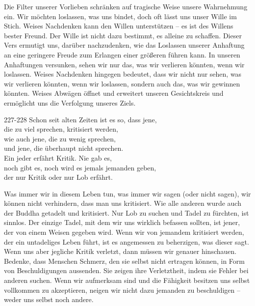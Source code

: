 \begin{dhpRefl}

Die Filter unserer Vorlieben schränken auf tragische Weise unsere Wahrnehmung
ein. Wir möchten loslassen, was uns bindet, doch oft lässt uns unser Wille im
Stich. Weises Nachdenken kann den Willen unterstützen – es ist des Willens
bester Freund. Der Wille ist nicht dazu bestimmt, es alleine zu schaffen.
Dieser Vers ermutigt uns, darüber nachzudenken, wie das Loslassen unserer
Anhaftung an eine geringere Freude zum Erlangen einer größeren führen kann. In
unseren Anhaftungen versunken, sehen wir nur das, was wir verlieren könnten,
wenn wir loslassen. Weises Nachdenken hingegen bedeutet, dass wir nicht nur
sehen, was wir verlieren könnten, wenn wir loslassen, sondern auch das, was
wir gewinnen könnten. Weises Abwägen öffnet und erweitert unseren
Gesichtskreis und ermöglicht uns die Verfolgung unseres Ziels.

\end{dhpRefl}


\begin{dhpVerse}{227-228}
\label{dhp-227}\label{dhp-228}
Schon seit alten Zeiten ist es so, dass jene,\\ 
die zu viel sprechen, kritisiert werden,\\ 
wie auch jene, die zu wenig sprechen,\\ 
und jene, die überhaupt nicht sprechen.\\ 
Ein jeder erfährt Kritik. Nie gab es,\\ 
noch gibt es, noch wird es jemals jemanden geben, \\ 
der nur Kritik oder nur Lob erfährt. 
\end{dhpVerse}

\begin{dhpRefl}

Was immer wir in diesem Leben tun, was immer wir sagen (oder nicht sagen), wir
können nicht verhindern, dass man uns kritisiert. Wie alle anderen wurde auch
der Buddha getadelt und kritisiert. Nur Lob zu suchen und Tadel zu fürchten,
ist sinnlos. Der einzige Tadel, mit dem wir uns wirklich befassen sollten, ist
jener, der von einem Weisen gegeben wird. Wenn wir von jemandem kritisiert
werden, der ein untadeliges Leben führt, ist es angemessen zu beherzigen, was
dieser sagt. Wenn uns aber jegliche Kritik verletzt, dann müssen wir genauer
hinschauen. Bedenke, dass Menschen Schmerz, den sie selbst nicht ertragen
können, in Form von Beschuldigungen aussenden. Sie zeigen ihre Verletztheit,
indem sie Fehler bei anderen suchen. Wenn wir aufmerksam sind und die
Fähigkeit besitzen uns selbst vollkommen zu akzeptieren, neigen wir nicht dazu
jemanden zu beschuldigen -- weder uns selbst noch andere.

\end{dhpRefl}

